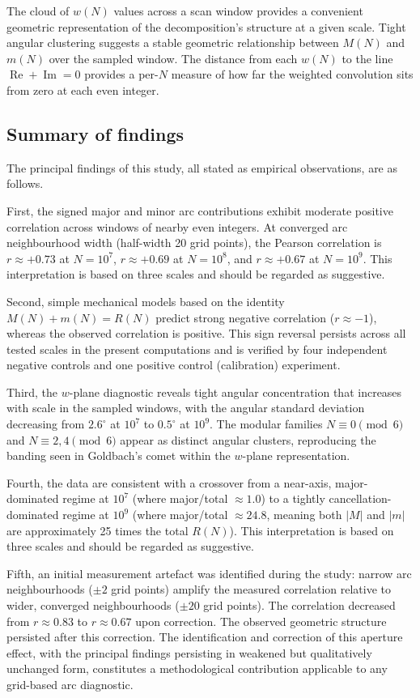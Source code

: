 \documentclass[11pt,a4paper]{article}
\newcommand{\RN}{R(N)}
\newcommand{\MN}{M(N)}
\newcommand{\mN}{m(N)}
\newcommand{\wN}{w(N)}
\begin{document}
The cloud of $\wN$ values across a scan window provides a convenient geometric representation of the decomposition's structure at a given scale. Tight angular clustering suggests a stable geometric relationship between $\MN$ and $\mN$ over the sampled window. The distance from each $\wN$ to the line $\operatorname{Re} + \operatorname{Im} = 0$ provides a per-$N$ measure of how far the weighted convolution sits from zero at each even integer.


\subsection{Summary of findings}

The principal findings of this study, all stated as empirical observations, are as follows.

First, the signed major and minor arc contributions exhibit moderate positive correlation across windows of nearby even integers. At converged arc neighbourhood width (half-width 20 grid points), the Pearson correlation is $r \approx +0.73$ at $N = 10^7$, $r \approx +0.69$ at $N = 10^8$, and $r \approx +0.67$ at $N = 10^9$. This interpretation is based on three scales and should be regarded as suggestive.

Second, simple mechanical models based on the identity $\MN + \mN = \RN$ predict strong negative correlation ($r \approx -1$), whereas the observed correlation is positive. This sign reversal persists across all tested scales in the present computations and is verified by four independent negative controls and one positive control (calibration) experiment.

Third, the $w$-plane diagnostic reveals tight angular concentration that increases with scale in the sampled windows, with the angular standard deviation decreasing from $2.6^\circ$ at $10^7$ to $0.5^\circ$ at $10^9$. The modular families $N \equiv 0 \pmod{6}$ and $N \equiv 2, 4 \pmod{6}$ appear as distinct angular clusters, reproducing the banding seen in Goldbach's comet within the $w$-plane representation.

Fourth, the data are consistent with a crossover from a near-axis, major-dominated regime at $10^7$ (where major/total $\approx 1.0$) to a tightly cancellation-dominated regime at $10^9$ (where major/total $\approx 24.8$, meaning both $|M|$ and $|m|$ are approximately 25 times the total $\RN$). This interpretation is based on three scales and should be regarded as suggestive.

Fifth, an initial measurement artefact was identified during the study: narrow arc neighbourhoods ($\pm 2$ grid points) amplify the measured correlation relative to wider, converged neighbourhoods ($\pm 20$ grid points). The correlation decreased from $r \approx 0.83$ to $r \approx 0.67$ upon correction. The observed geometric structure persisted after this correction. The identification and correction of this aperture effect, with the principal findings persisting in weakened but qualitatively unchanged form, constitutes a methodological contribution applicable to any grid-based arc diagnostic.
\end{document}
